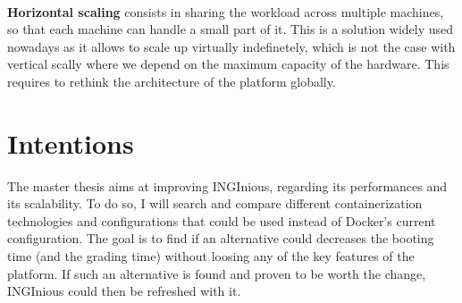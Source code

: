 \paragraph{} \textbf{Horizontal scaling} consists in sharing the workload across multiple machines, so that each machine can handle a small part of it.  This is a solution widely used nowadays as it allows to scale up virtually indefinetely, which is not the case with vertical scally where we depend on the maximum capacity of the hardware.  This requires to rethink the architecture of the platform globally.

\section{Intentions}
The master thesis aims at improving INGInious, regarding its performances and its scalability.  To do so, I will search and compare different containerization technologies and configurations that could be used instead of Docker's current configuration.  The goal is to find if an alternative could decreases the booting time (and the grading time) without loosing any of the key features of the platform.  If such an alternative is found and proven to be worth the change, INGInious could then be refreshed with it.
